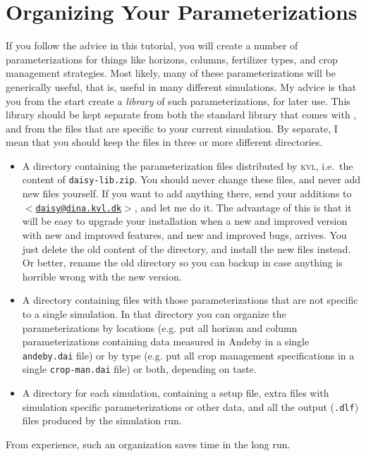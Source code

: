 \documentclass[a4paper,11pt]{article}
\begin{document}
\section{Organizing Your Parameterizations}
\label{sec:files}

If you follow the advice in this tutorial, you will create a number of
parameterizations for things like horizons, columns, fertilizer types,
and crop management strategies.  Most likely, many of these
parameterizations will be generically useful, that is, useful in many
different simulations.  My advice is that you from the start create a
\emph{library} of such parameterizations, for later use.  This library
should be kept separate from both the standard library that comes with
\daisy{}, and from the files that are specific to your current
simulation.  By separate, I mean that you should keep the files in
three or more different directories.
\begin{itemize}
\item A directory containing the parameterization files distributed by
  \textsc{kvl}, i.e.\ the content of \texttt{daisy-lib.zip}.  You
  should never change these files, and never add new files yourself.
  If you want to add anything there, send your additions to
  \href{mailto:daisy@dina.kvl.dk}{\texttt{$<$daisy@dina.kvl.dk$>$}},
  and let me do it.  The advantage of this is that it will be easy to
  upgrade your \daisy{} installation when a new and improved version
  with new and improved features, and new and improved bugs, arrives.
  You just delete the old content of the directory, and install the
  new files instead.  Or better, rename the old directory so you can
  backup in case anything is horrible wrong with the new version.
\item A directory containing files with those parameterizations that
  are not specific to a single simulation.  In that directory you can
  organize the parameterizations by locations (e.g. put all horizon
  and column parameterizations containing data measured in Andeby in a
  single \texttt{andeby.dai} file) or by type (e.g. put all crop
  management specifications in a single \texttt{crop-man.dai} file) or
  both, depending on taste.
\item A directory for each simulation, containing a setup file, extra
  files with simulation specific parameterizations or other data, and
  all the output (\texttt{.dlf}) files produced by the simulation run.
\end{itemize}
From experience, such an organization saves time in the long run.  
\end{document}

